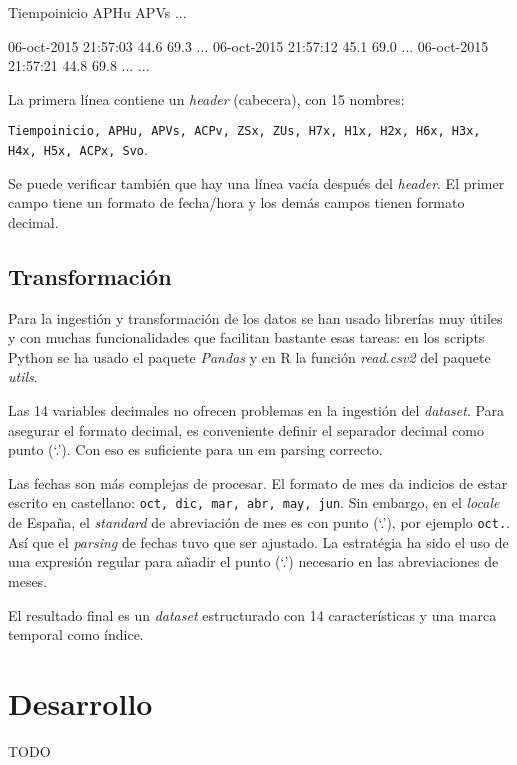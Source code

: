 \documentclass[11pt,spanish,listoffigures,listoftables]{tfgetsinf}
\begin{document}
\begin{verbatim*}
Tiempoinicio                    	APHu                            	APVs ...
                     	                 	                 	                 	                 	                 	                 	                 	                 	                 	                 	                 	                 	                 	                 
06-oct-2015 21:57:03 	44.6             	69.3 ...
06-oct-2015 21:57:12 	45.1             	69.0 ...
06-oct-2015 21:57:21 	44.8             	69.8 ...
...
\end{verbatim*}


La primera línea contiene un {\em header} (cabecera), con 15 nombres: 

{\tt Tiempoinicio, APHu, APVs, ACPv, ZSx, ZUs, H7x, H1x, H2x, H6x, H3x, H4x, H5x, ACPx, Svo}. 

Se puede verificar también que hay una línea vacía después del {\em header}. El primer campo tiene un formato de fecha/hora y los demás campos tienen formato decimal.

\section{Transformación}
Para la ingestión y transformación de los datos se han usado librerías muy útiles y con muchas funcionalidades que facilitan bastante esas tareas: en los scripts Python se ha usado el paquete {\em Pandas} y en R la función {\em read.csv2} del paquete {\em utils}.

Las 14 variables decimales no ofrecen problemas en la ingestión del {\em dataset}. Para asegurar el formato decimal, es conveniente definir el separador decimal como punto (`.'). Con eso es suficiente para un {em parsing} correcto.

Las fechas son más complejas de procesar. El formato de mes da indicios de estar escrito en castellano: {\tt oct, dic, mar, abr, may, jun}. Sin embargo, en el {\em locale} de España, el {\em standard} de abreviación de mes es con punto (`.'), por ejemplo {\tt oct.}. Así que el {\em parsing} de fechas tuvo que ser ajustado. La estratégia ha sido el uso de una expresión regular para añadir el punto (`.') necesario en las abreviaciones de meses.

El resultado final es un {\em dataset} estructurado con 14 características y una marca temporal como índice. 


\chapter{Desarrollo}
TODO 
\end{document}

